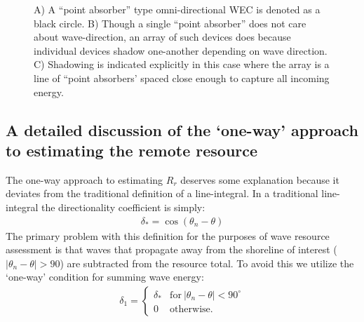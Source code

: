 \begin{figure}[ht]
    \centering
    \caption{A) A ``point absorber'' type omni-directional WEC is denoted as a black circle. B) Though a single ``point absorber'' does not care about wave-direction, an array of such devices does because individual devices shadow one-another depending on wave direction. C) Shadowing is indicated explicitly in this case where the array is a line of ``point absorbers' spaced close enough to capture all incoming energy.}
    \label{fig:omni-dir}
\end{figure}

\subsection{A detailed discussion of the `one-way' approach to estimating the remote resource}

The one-way approach to estimating $R_r$ deserves some explanation because it deviates from the traditional definition of a line-integral. In a traditional line-integral the directionality coefficient is simply:
\begin{align}
    \delta_{*} = \cos(\theta_n - \theta)
    \label{eqn:trad-def}
\end{align}
The primary problem with this definition for the purposes of wave resource assessment is that waves that propagate away from the shoreline of interest ($|\theta_n - \theta|>90$) are subtracted from the resource total. To avoid this we utilize the `one-way' condition for summing wave energy:
\begin{align}
    \delta_1 = 
    \begin{cases}
     \delta_* & \mathrm{for\ }|\theta_n - \theta|<90^\circ \\
    0 & \mathrm{otherwise}.
    \end{cases}
    \label{eqn:1way-def}
\end{align}


